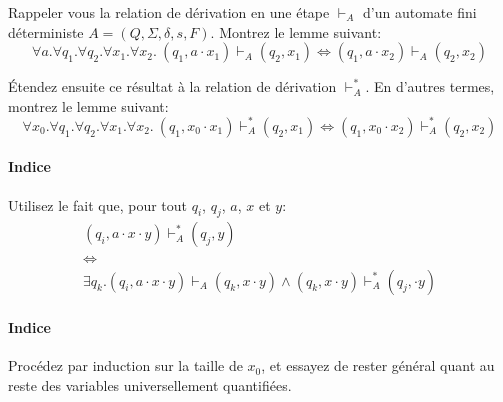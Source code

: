 \documentclass[12pt,french,a4paper]{article}
\begin{document}
\begin{question}
Rappeler vous la relation de dérivation en une étape $\vdash_A$ d'un automate fini déterministe $A = (Q, \Sigma, \delta, s, F)$.
Montrez le lemme suivant:
\[
\forall a. \forall q_1. \forall q_2. \forall x_1. \forall x_2.\ (q_1, a \cdot x_1) \vdash_A (q_2, x_1) \iff  (q_1, a \cdot x_2) \vdash_A (q_2, x_2)
\]

Étendez ensuite ce résultat à la relation de dérivation $\vdash_A^*$.
En d'autres termes, montrez le lemme suivant:
\[
\forall x_0. \forall q_1. \forall q_2. \forall x_1. \forall x_2.\ (q_1, x_0 \cdot x_1) \vdash_A^* (q_2, x_1) \iff  (q_1, x_0 \cdot x_2) \vdash_A^* (q_2, x_2)
\]

\paragraph{Indice} Utilisez le fait que, pour tout $q_i$, $q_j$, $a$, $x$ et $y$:
\begin{gather*}
(q_i, a \cdot x \cdot y) \vdash_A^* (q_j, y)\\
\iff\\
\exists q_k. (q_i, a \cdot x \cdot y) \vdash_A (q_k, x \cdot y) \wedge (q_k, x \cdot y) \vdash_A^* (q_j, \cdot y)
\end{gather*}

\paragraph{Indice} Procédez par induction sur la taille de $x_0$, et essayez de rester général quant au reste des variables universellement quantifiées.

\end{question}
\end{document}
